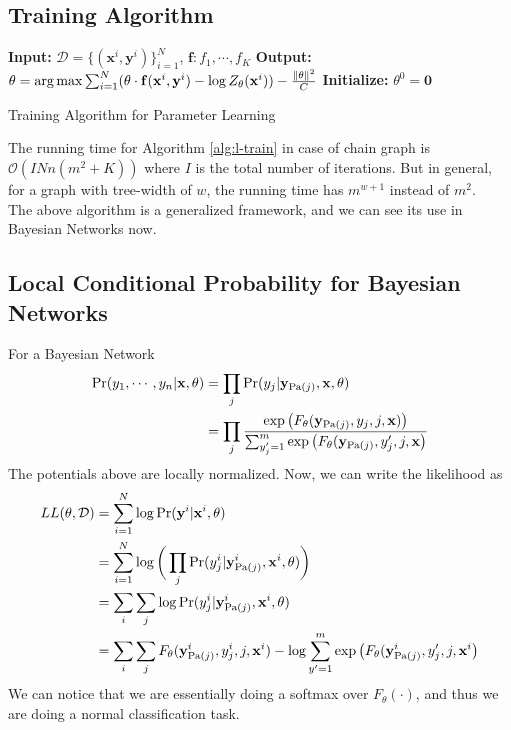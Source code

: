 \subsection{Training Algorithm}
\begin{algorithm}[H]\label{alg:l-train}
	\DontPrintSemicolon
	\textbf{Input:} $\mathcal{D} = \{(\mathbf x^i, \mathbf y^i)\}_{i=1}^N$, $\mathbf f: f_1, \cdots, f_K$\;
	\textbf{Output:} $\theta = \operatorname*{arg\,max} \sum_{i=1}^N (\theta \cdot \mathbf f(\mathbf x^i, \mathbf y^i) - \log Z_\theta (\mathbf x^i)) - \frac{\|\theta\|^2}{C}$\;
	\textbf{Initialize:} $\theta^0 = \mathbf 0$\;
	\caption{Training Algorithm for Parameter Learning}
\end{algorithm}
The running time for Algorithm \ref{alg:l-train} in case of chain graph is $\mathcal{O}(INn(m^2+K))$ where $I$ is the total number of iterations. But in general, for a graph with tree-width of $w$, the running time has $m^{w+1}$ instead of $m^2$. \\
The above algorithm is a generalized framework, and we can see its use in Bayesian Networks now.
\subsection{Local Conditional Probability for Bayesian Networks} 
\noindent For a Bayesian Network
\begin{equation}
	\begin{split}
	\text{Pr}(y_1, \cdots, y_n|\mathbf x, \theta) &= \prod_j \text{Pr}(y_j|\mathbf y_{\text{Pa}(j)}, \mathbf x, \theta) \\
	&= \prod_j \dfrac{\exp\big(F_\theta(\mathbf{y}_{\text{Pa}(j)}, y_j, j, \mathbf x)\big)}{\sum_{y'_j=1}^m \exp\big(F_\theta(\mathbf{y}_{\text{Pa}(j)}, y'_j, j, \mathbf x\big)}
	\end{split}
\end{equation}
The potentials above are locally normalized. Now, we can write the likelihood as
\begin{equation}
	\begin{split}
LL(\theta, \mathcal D) &= \sum_{i=1}^N \log \text{Pr}(\mathbf y^i|\mathbf x^i, \theta) \\
&= \sum_{i=1}^N \log\bigg(\prod_j \text{Pr}(y^i_j|\mathbf y^i_{\text{Pa}(j)}, \mathbf x^i, \theta)\bigg) \\
&=\sum_{i}\sum_j \log \text{Pr}(y^i_j|\mathbf y^i_{\text{Pa}(j)}, \mathbf x^i, \theta) \\
&= \sum_i\sum_j F_\theta(\mathbf{y}^i_{\text{Pa}(j)}, y^i_j, j, \mathbf x^i) - \log\sum_{y'=1}^m \exp\big(F_\theta(\mathbf{y}^i_{\text{Pa}(j)}, y'_j, j, \mathbf x^i\big)
	\end{split}
\end{equation}
We can notice that we are essentially doing a softmax over $F_\theta(\cdot)$, and thus we are doing a normal classification task.
